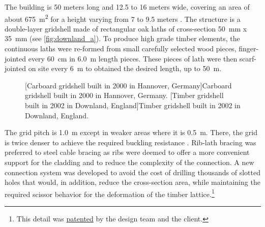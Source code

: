 The building is 50 meters long and 12.5 to 16 meters wide, covering an area of about \SI{675}{m^2} for a height varying from 7 to 9.5 meters \cite{Harris2002}. The structure is a double-layer gridshell made of rectangular oak laths of cross-section \SI{50}{mm} x \SI{35}{mm} (see \cref{fig:downland_a}). To produce high grade timber elements, the continuous laths were re-formed from small carefully selected wood pieces, finger-jointed every \SI{60}{cm} in \SI{6.0}{m} length pieces. These pieces of lath were then scarf-jointed on site every \SI{6}{m} to obtained the desired length, up to \SI{50}{m}.
\begin{figure}[t]
     	\centering
		\hspace*{\fill}
		\vspace{10pt}
		[Carboard gridshell built in 2000 in Hannover, Germany]{Carboard gridshell built in 2000 in Hannover, Germany.}
		\label{fig:hannover}    
		\vspace{0.5cm}
		\hspace*{\fill}
		\vspace{10pt}
		[Timber gridshell built in 2002 in Downland, England]{Timber gridshell built in 2002 in Downland, England.}
		\label{fig:downland}    
\end{figure}

The grid pitch is \SI{1.0}{m} except in weaker areas where it is \SI{0.5}{m}. There, the grid is twice denser to achieve the required buckling resistance \cite{Harris2003}. Rib-lath bracing was preferred to steel cable bracing as ribs were deemed to offer a more convenient support for the cladding and to reduce the complexity of the connection. A new connection system was developed to avoid the cost of drilling thousands of slotted holes that would, in addition, reduce the cross-section area, while maintaining the required scissor behavior for the deformation of the timber lattice.\footnote{This detail was \href{https://patents.google.com/patent/GB2361504A/en?q=\%22A+coupling+and+a+method+of+constructing+grid+shell+buildings+using+such+a+coupling\%22&country=GB}{patented} by the design team and the client.}

